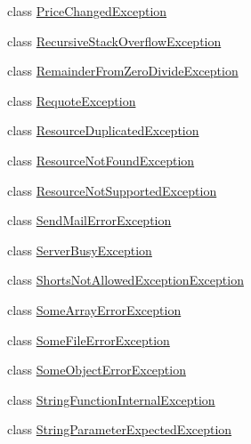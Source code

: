\begin{DoxyCompactItemize}
\item 
class \hyperlink{class_m_q_l4_c_sharp_1_1_base_1_1_exceptions_1_1_price_changed_exception}{Price\+Changed\+Exception}
\item 
class \hyperlink{class_m_q_l4_c_sharp_1_1_base_1_1_exceptions_1_1_recursive_stack_overflow_exception}{Recursive\+Stack\+Overflow\+Exception}
\item 
class \hyperlink{class_m_q_l4_c_sharp_1_1_base_1_1_exceptions_1_1_remainder_from_zero_divide_exception}{Remainder\+From\+Zero\+Divide\+Exception}
\item 
class \hyperlink{class_m_q_l4_c_sharp_1_1_base_1_1_exceptions_1_1_requote_exception}{Requote\+Exception}
\item 
class \hyperlink{class_m_q_l4_c_sharp_1_1_base_1_1_exceptions_1_1_resource_duplicated_exception}{Resource\+Duplicated\+Exception}
\item 
class \hyperlink{class_m_q_l4_c_sharp_1_1_base_1_1_exceptions_1_1_resource_not_found_exception}{Resource\+Not\+Found\+Exception}
\item 
class \hyperlink{class_m_q_l4_c_sharp_1_1_base_1_1_exceptions_1_1_resource_not_supported_exception}{Resource\+Not\+Supported\+Exception}
\item 
class \hyperlink{class_m_q_l4_c_sharp_1_1_base_1_1_exceptions_1_1_send_mail_error_exception}{Send\+Mail\+Error\+Exception}
\item 
class \hyperlink{class_m_q_l4_c_sharp_1_1_base_1_1_exceptions_1_1_server_busy_exception}{Server\+Busy\+Exception}
\item 
class \hyperlink{class_m_q_l4_c_sharp_1_1_base_1_1_exceptions_1_1_shorts_not_allowed_exception_exception}{Shorts\+Not\+Allowed\+Exception\+Exception}
\item 
class \hyperlink{class_m_q_l4_c_sharp_1_1_base_1_1_exceptions_1_1_some_array_error_exception}{Some\+Array\+Error\+Exception}
\item 
class \hyperlink{class_m_q_l4_c_sharp_1_1_base_1_1_exceptions_1_1_some_file_error_exception}{Some\+File\+Error\+Exception}
\item 
class \hyperlink{class_m_q_l4_c_sharp_1_1_base_1_1_exceptions_1_1_some_object_error_exception}{Some\+Object\+Error\+Exception}
\item 
class \hyperlink{class_m_q_l4_c_sharp_1_1_base_1_1_exceptions_1_1_string_function_internal_exception}{String\+Function\+Internal\+Exception}
\item 
class \hyperlink{class_m_q_l4_c_sharp_1_1_base_1_1_exceptions_1_1_string_parameter_expected_exception}{String\+Parameter\+Expected\+Exception}

\end{DoxyCompactItemize}
